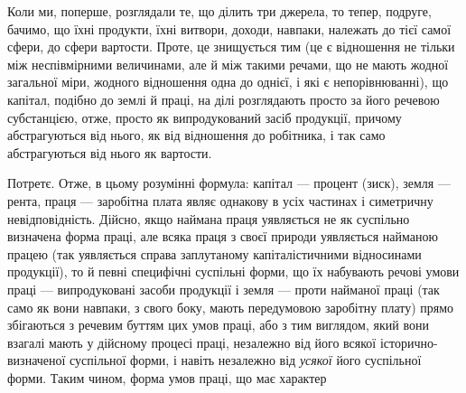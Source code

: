 Коли ми, поперше, розглядали те, що ділить три джерела, то тепер, подруге,
бачимо, що їхні продукти, їхні витвори, доходи, навпаки, належать до тієї
самої сфери, до сфери вартости. Проте, це знищується тим (це є відношення
не тільки між неспівмірними величинами, але й між такими речами, що не
мають жодної загальної міри, жодного відношення одна до однієї, і які є непорівнюванні),
що капітал, подібно до землі й праці, на ділі розглядають просто за
його речевою субстанцією, отже, просто як випродукований засіб продукції,
причому абстрагуються від нього, як від відношення до робітника, і так само
абстрагуються від нього як вартости.

Потретє. Отже, в цьому розумінні формула: капітал — процент (зиск), земля
— рента, праця — заробітна плата являє однакову в усіх частинах і симетричну
невідповідність. Дійсно, якщо наймана праця уявляється не як суспільно
визначена форма праці, але всяка праця з своєї природи уявляється найманою
працею (так уявляється справа заплутаному капіталістичними відносинами
продукції), то й певні специфічні суспільні форми, що їх набувають речові умови
праці — випродуковані засоби продукції і земля — проти найманої праці
(так само як вони навпаки, з свого боку, мають передумовою заробітну
плату) прямо збігаються з речевим буттям цих умов праці, або з тим
виглядом, який вони взагалі мають у дійсному процесі праці, незалежно
від його всякої історично-визначеної суспільної форми, і навіть незалежно від
\emph{усякої} його суспільної форми. Таким чином, форма умов праці, що має характер
\parbreak{}  %
